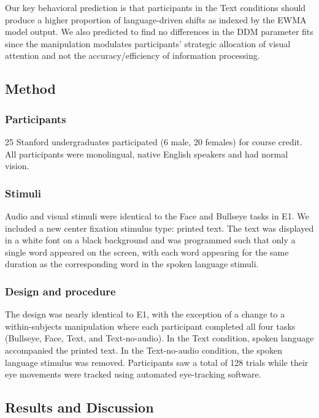 \documentclass[10pt, letterpaper]{article}
\begin{document}
Our key behavioral prediction is that participants in the Text
conditions should produce a higher proportion of language-driven shifts
as indexed by the EWMA model output. We also predicted to find no
differences in the DDM parameter fits since the manipulation modulates
participants' strategic allocation of visual attention and not the
accuracy/efficiency of information processing.

\subsection{Method}\label{method-1}

\subsubsection{Participants}\label{participants-1}

25 Stanford undergraduates participated (6 male, 20 females) for course
credit. All participants were monolingual, native English speakers and
had normal vision.

\subsubsection{Stimuli}\label{stimuli-1}

Audio and visual stimuli were identical to the Face and Bullseye tasks
in E1. We included a new center fixation stimulus type: printed text.
The text was displayed in a white font on a black background and was
programmed such that only a single word appeared on the screen, with
each word appearing for the same duration as the corresponding word in
the spoken language stimuli.

\subsubsection{Design and procedure}\label{design-and-procedure-1}

The design was nearly identical to E1, with the exception of a change to
a within-subjects manipulation where each participant completed all four
tasks (Bullseye, Face, Text, and Text-no-audio). In the Text condition,
spoken language accompanied the printed text. In the Text-no-audio
condition, the spoken language stimulus was removed. Participants saw a
total of 128 trials while their eye movements were tracked using
automated eye-tracking software.

\subsection{Results and Discussion}\label{results-and-discussion-1}
\end{document}
